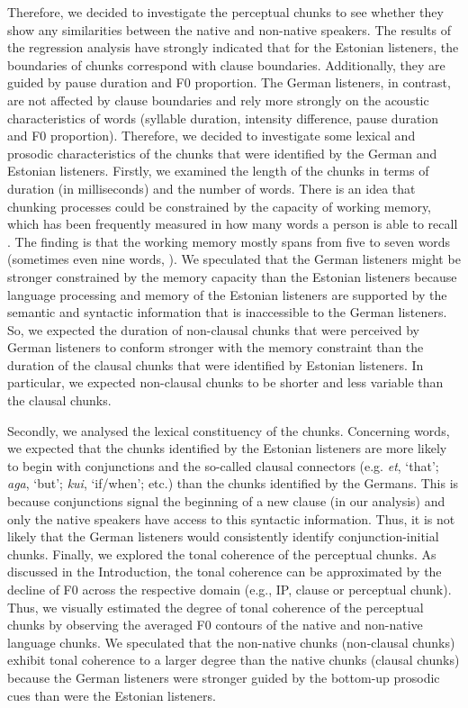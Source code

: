 \documentclass[output=paper]{langscibook}
\begin{document}
    Therefore, we decided to investigate the perceptual chunks to see whether they show any similarities between the native and non-native speakers. The results of the regression analysis have strongly indicated that for the Estonian listeners, the boundaries of chunks correspond with clause boundaries. Additionally, they are guided by pause duration and F0 proportion. The German listeners, in contrast, are not affected by clause boundaries and rely more strongly on the acoustic characteristics of words (syllable duration, intensity difference, pause duration and F0 proportion). Therefore, we decided to investigate some lexical and prosodic characteristics of the chunks that were identified by the German and Estonian listeners. Firstly, we examined the length of the chunks in terms of duration (in milliseconds) and the number of words. There is an idea that chunking processes could be constrained by the capacity of working memory, which has been frequently measured in how many words a person is able to recall \citep[][]{green2017}. The finding is that the working memory mostly spans from five to seven words (sometimes even nine words, \citealp[][]{miller1956}). We speculated that the German listeners might be stronger constrained by the memory capacity than the Estonian listeners because language processing and memory of the Estonian listeners are supported by the semantic and syntactic information that is inaccessible to the German listeners. So, we expected the duration of non-clausal chunks that were perceived by German listeners to conform stronger with the memory constraint than the duration of the clausal chunks that were identified by Estonian listeners. In particular, we expected non-clausal chunks to be shorter and less variable than the clausal chunks.
    
    Secondly, we analysed the lexical constituency of the chunks. Concerning words, we expected that the chunks identified by the Estonian listeners are more likely to begin with conjunctions and the so-called clausal connectors (e.g. \textit{et}, ‘that’; \textit{aga}, ‘but’; \textit{kui}, ‘if/when’; etc.) than the chunks identified by the Germans. This is because conjunctions signal the beginning of a new clause (in our analysis) and only the native speakers have access to this syntactic information. Thus, it is not likely that the German listeners would consistently identify conjunction-initial chunks. Finally, we explored the tonal coherence of the perceptual chunks. As discussed in the Introduction, the tonal coherence can be approximated by the decline of F0 across the respective domain (e.g., IP, clause or perceptual chunk). Thus, we visually estimated the degree of tonal coherence of the perceptual chunks by observing the averaged F0 contours of the native and non-native language chunks. We speculated that the non-native chunks (non-clausal chunks) exhibit tonal coherence to a larger degree than the native chunks (clausal chunks) because the German listeners were stronger guided by the bottom-up prosodic cues than were the Estonian listeners.
    
\end{document}
